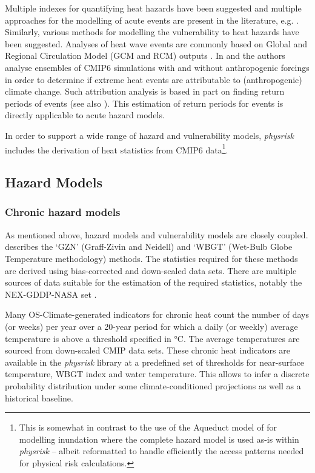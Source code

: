 \documentclass[a4paper,11pt]{extarticle} %
\theoremstyle{definition}
\begin{document}
Multiple indexes for quantifying heat hazards have been suggested and multiple approaches for the modelling of acute events are present in the literature, e.g. \cite{MazdiyasniEtAl:2019}. Similarly, various methods for modelling the vulnerability to heat hazards have been suggested. Analyses of heat wave events are commonly based on Global and Regional Circulation Model (GCM and RCM) outputs \cite{DosioEtAl:2018}. In \cite{Christidis:2021} and \cite{Christidis:2013} the authors analyse ensembles of CMIP6 simulations with and without anthropogenic forcings in order to determine if extreme heat events are attributable to (anthropogenic) climate change. Such attribution analysis is based in part on finding return periods of events (see also \cite{StottEtAl:2016}). This estimation of return periods for events is directly applicable to acute hazard models.

In order to support a wide range of hazard and vulnerability models,  \emph{physrisk} includes the derivation of heat statistics from CMIP6 data\footnote{This is somewhat in contrast to the use of the Aqueduct model of \cite{WardEtAl:2020} for modelling inundation where the complete hazard model is used as-is within \emph{physrisk} -- albeit reformatted to handle efficiently the access patterns needed for physical risk calculations.}.

\subsection{Hazard Models}

\subsubsection{Chronic hazard models}
As mentioned above, hazard models and vulnerability models are closely coupled. \cite{ZhangAndShindell:2021} describes the `GZN' (Graff-Zivin and Neidell) and `WBGT' (Wet-Bulb Globe Temperature methodology) methods. The statistics required for these methods are derived using bias-corrected and down-scaled data sets. There are multiple sources of data suitable for the estimation of the required statistics, notably the NEX-GDDP-NASA set \cite{ThrasherEtAl:2022}.

Many OS-Climate-generated indicators for chronic heat count the number of days (or weeks) per year over a 20-year period for which a daily (or weekly) average temperature is above a threshold specified in °C. The average temperatures are sourced from down-scaled \gls{CMIP} data sets. These chronic heat indicators are available in the \emph{physrisk} library at a predefined set of thresholds for near-surface temperature, WBGT index and water temperature. This allows to infer a discrete probability distribution under some climate-conditioned projections as well as a historical baseline.
\end{document}
